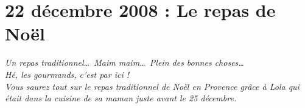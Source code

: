 \documentclass[11pt, french]{report}
\begin{document}
\chapter{22 décembre 2008 : Le repas de Noël}

\textit{Un repas traditionnel\ldots\ Maim maim\ldots\ Plein des bonnes
choses\ldots\ \\
Hé, les gourmands, c'est par ici !\\
Vous saurez tout sur le repas traditionnel de Noël en Provence grâce à Lola
qui était dans la cuisine de sa maman juste avant le 25 décembre.} 

\vfill
\end{document}
